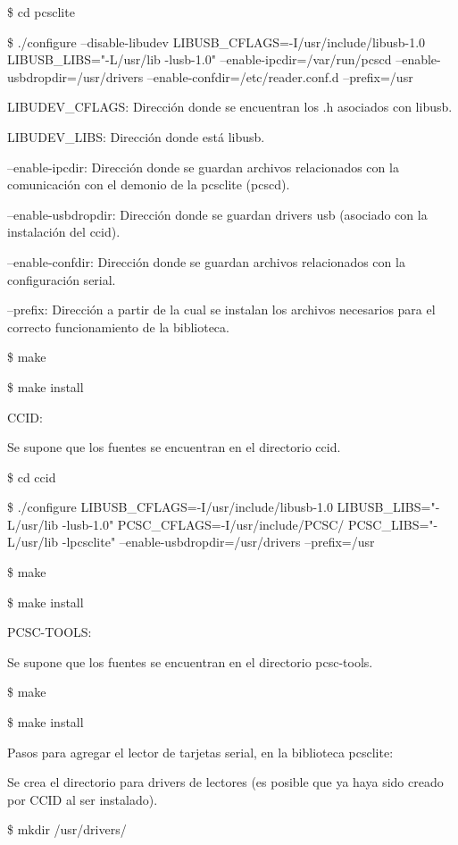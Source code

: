 \centerline{\$ cd pcsclite}

\$ ./configure --disable-libudev LIBUSB\_CFLAGS=-I/usr/include/libusb-1.0 LIBUSB\_LIBS="-L/usr/lib -lusb-1.0" --enable-ipcdir=/var/run/pcscd --enable-usbdropdir=/usr/drivers --enable-confdir=/etc/reader.conf.d --prefix=/usr

\bigskip
LIBUDEV\_CFLAGS: Dirección donde se encuentran los .h asociados con libusb.

LIBUDEV\_LIBS: Dirección donde está libusb.

--enable-ipcdir: Dirección donde se guardan archivos relacionados con la comunicación con el demonio de la pcsclite (pcscd).

--enable-usbdropdir: Dirección donde se guardan drivers usb (asociado con la instalación del ccid).

--enable-confdir: Dirección donde se guardan archivos relacionados con la configuración serial.

--prefix:  Dirección a partir de la cual se instalan los archivos necesarios para el correcto funcionamiento de la biblioteca.

\bigskip
\centerline{\$ make}

\centerline{\$ make install}

\bigskip
CCID:

\bigskip
Se supone que los fuentes se encuentran en el directorio ccid.

\bigskip
\centerline{\$ cd ccid}

\$ ./configure LIBUSB\_CFLAGS=-I/usr/include/libusb-1.0 LIBUSB\_LIBS="-L/usr/lib -lusb-1.0" PCSC\_CFLAGS=-I/usr/include/PCSC/ PCSC\_LIBS="-L/usr/lib -lpcsclite" --enable-usbdropdir=/usr/drivers --prefix=/usr

\centerline{\$ make}

\centerline{\$ make install}

\bigskip
PCSC-TOOLS:

\bigskip
Se supone que los fuentes se encuentran en el directorio pcsc-tools.

\bigskip
\centerline{\$ make}

\centerline{\$ make install}

\bigskip
\bigskip
Pasos para agregar el lector de tarjetas serial, en la biblioteca pcsclite:

\bigskip
Se crea el directorio para drivers de lectores (es posible que ya haya sido creado por CCID al ser instalado). 

\bigskip
\centerline{\$ mkdir /usr/drivers/}

